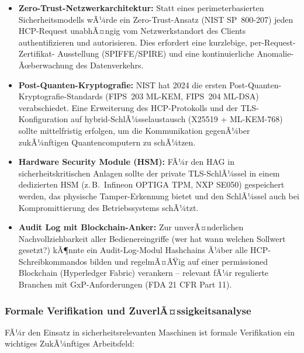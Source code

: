 ﻿\documentclass[12pt,a4paper]{article}
\begin{document}
\begin{itemize}[leftmargin=2em]
  \item \textbf{Zero-Trust-Netzwerkarchitektur:} Statt eines perimeterbasierten
    Sicherheitsmodells wÃ¼rde ein Zero-Trust-Ansatz (NIST SP~800-207) jeden
    HCP-Request unabhÃ¤ngig vom Netzwerkstandort des Clients authentifizieren
    und autorisieren. Dies erfordert eine kurzlebige, per-Request-Zertifikat-
    Ausstellung (SPIFFE/SPIRE) und eine kontinuierliche Anomalie-Ãœberwachung
    des Datenverkehrs.
  \item \textbf{Post-Quanten-Kryptografie:} NIST hat 2024 die ersten
    Post-Quanten-Kryptografie-Standards (FIPS~203 ML-KEM, FIPS~204 ML-DSA)
    verabschiedet. Eine Erweiterung des HCP-Protokolls und der
    TLS-Konfiguration auf hybrid-SchlÃ¼sselaustausch (X25519 + ML-KEM-768)
    sollte mittelfristig erfolgen, um die Kommunikation gegenÃ¼ber zukÃ¼nftigen
    Quantencomputern zu schÃ¼tzen.
  \item \textbf{Hardware Security Module (HSM):} FÃ¼r den HAG in
    sicherheitskritischen Anlagen sollte der private TLS-SchlÃ¼ssel in einem
    dedizierten HSM (z.\,B.\ Infineon OPTIGA TPM, NXP SE050) gespeichert
    werden, das physische Tamper-Erkennung bietet und den SchlÃ¼ssel auch
    bei Kompromittierung des Betriebssystems schÃ¼tzt.
  \item \textbf{Audit Log mit Blockchain-Anker:} Zur unverÃ¤nderlichen
    Nachvollziehbarkeit aller Bedienereingriffe (wer hat wann welchen
    Sollwert gesetzt?) kÃ¶nnte ein Audit-Log-Modul Hashchains Ã¼ber
    alle HCP-Schreibkommandos bilden und regelmÃ¤ÃŸig auf einer permissioned
    Blockchain (Hyperledger Fabric) verankern -- relevant fÃ¼r
    regulierte Branchen mit GxP-Anforderungen (FDA 21 CFR Part 11).
\end{itemize}

\subsubsection*{Formale Verifikation und ZuverlÃ¤ssigkeitsanalyse}

FÃ¼r den Einsatz in sicherheitsrelevanten Maschinen ist formale Verifikation
ein wichtiges ZukÃ¼nftiges Arbeitsfeld:
\end{document}
